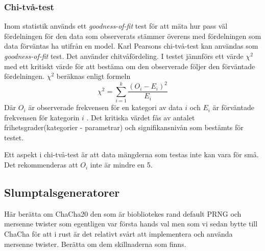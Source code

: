\documentclass[swedish,a4paper]{article}
\begin{document}
\subsubsection{Chi-två-test}
\label{sec:chi_square}
Inom statistik används ett \textit{goodness-of-fit} test för att mäta
hur pass väl fördelningen för den data som observerats stämmer överens
med fördelningen som data förväntas ha utifrån en model. Karl Pearsons
chi-två-test kan användas som \textit{goodness-of-fit} test. Det
använder chitvåfördeling. I testet jämnförs ett värde $\chi^2$ med ett
kritiskt värde för att bestäma om den observerade följer den förväntade
fördelningen. $\chi^2$ beräknas enligt formeln
$$\chi^2 = \sum_{i=1}^k\frac{(O_i - E_i)^2}{E_i}$$
Där $O_i$ är observerade frekvensen för en kategori av data $i$ och $E_i$
är förväntade frekvensen för kategorin $i$ \parencite{nist}.
Det kritiska värdet fås av antalet frihetsgrader(kategorier - parametrar)
och signifikansnivån som bestämts för testet.

Ett aspekt i chi-två-test är att data mängderna som testas inte kan vara för
små. Det rekommenderas att $O_i$ inte är mindre en 5.



\subsection{Slumptalsgeneratorer}
\label{sec:prng}
Här berätta om ChaCha20 \parencite{chacha} den som är biobliotekes rand
\parencite{rand_crate} default PRNG och mersenne twister som egentligen var första
hands val
\parencite{mersenne_twister} men som vi sedan bytte till ChaCha för att i rust
är det relativt svårt att  implementera och använda mersenne twister. Berätta om
dem skillnaderna som finns.
\end{document}
